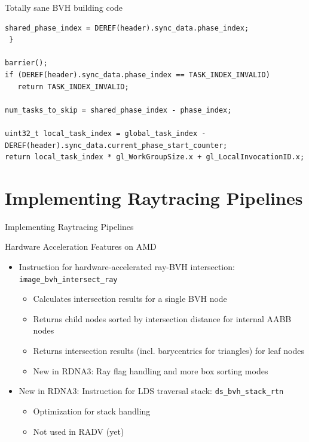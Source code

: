 \documentclass[aspectratio=169,t]{beamer}
\begin{document}
\begin{frame}[fragile]{Totally sane BVH building code}
\begin{lstlisting}[columns=fullflexible]
   shared_phase_index = DEREF(header).sync_data.phase_index;
 }

barrier();
if (DEREF(header).sync_data.phase_index == TASK_INDEX_INVALID)
   return TASK_INDEX_INVALID;

num_tasks_to_skip = shared_phase_index - phase_index;

uint32_t local_task_index = global_task_index - DEREF(header).sync_data.current_phase_start_counter;
return local_task_index * gl_WorkGroupSize.x + gl_LocalInvocationID.x;
  \end{lstlisting}
  \normalsize
\end{frame}

\section{Implementing Raytracing Pipelines}

\chapterIntroConfig
\begin{slide}{Implementing Raytracing Pipelines}
\end{slide}

\begin{slide}{Hardware Acceleration Features on AMD}
 \begin{itemize}
  \item Instruction for hardware-accelerated ray-BVH intersection: \texttt{image\_bvh\_intersect\_ray}
  \begin{itemize}
   \item Calculates intersection results for a single BVH node
   \item Returns child nodes sorted by intersection distance for internal AABB nodes
   \item Returns intersection results (incl. barycentrics for triangles) for leaf nodes
   \item New in RDNA3: Ray flag handling and more box sorting modes
  \end{itemize}
 \end{itemize}
 \begin{itemize}
  \item New in RDNA3: Instruction for LDS traversal stack: \texttt{ds\_bvh\_stack\_rtn}
  \begin{itemize}
   \item Optimization for stack handling
   \item Not used in RADV (yet)
  \end{itemize}
 \end{itemize}
\end{slide}
\end{document}
